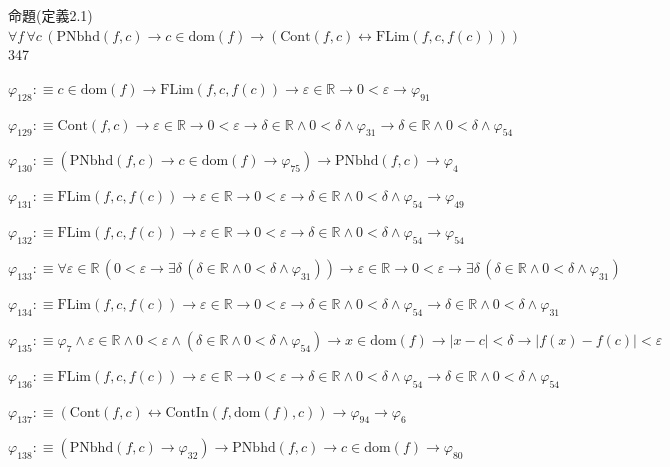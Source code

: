 \begin{fullproof}{命題(定義2.1)}{$\forall f\,\forall c\,(\mathrm{PNbhd}(f,c) \to c \in \mathrm{dom}(f) \to (\mathrm{Cont}(f,c) \leftrightarrow \mathrm{FLim}(f,c,f(c))))$}{347}
\begin{abbrevlist}
\item $\varphi_{128} :\equiv c \in \mathrm{dom}(f) \to \mathrm{FLim}(f,c,f(c)) \to \varepsilon \in \mathbb{R} \to 0 < \varepsilon \to \varphi_{91}$
\item $\varphi_{129} :\equiv \mathrm{Cont}(f,c) \to \varepsilon \in \mathbb{R} \to 0 < \varepsilon \to \delta \in \mathbb{R} \land 0 < \delta \land \varphi_{31} \to \delta \in \mathbb{R} \land 0 < \delta \land \varphi_{54}$
\item $\varphi_{130} :\equiv (\mathrm{PNbhd}(f,c) \to c \in \mathrm{dom}(f) \to \varphi_{75}) \to \mathrm{PNbhd}(f,c) \to \varphi_{4}$
\item $\varphi_{131} :\equiv \mathrm{FLim}(f,c,f(c)) \to \varepsilon \in \mathbb{R} \to 0 < \varepsilon \to \delta \in \mathbb{R} \land 0 < \delta \land \varphi_{54} \to \varphi_{49}$
\item $\varphi_{132} :\equiv \mathrm{FLim}(f,c,f(c)) \to \varepsilon \in \mathbb{R} \to 0 < \varepsilon \to \delta \in \mathbb{R} \land 0 < \delta \land \varphi_{54} \to \varphi_{54}$
\item $\varphi_{133} :\equiv \forall \varepsilon \in \mathbb{R}\,(0 < \varepsilon \to \exists \delta\,(\delta \in \mathbb{R} \land 0 < \delta \land \varphi_{31})) \to \varepsilon \in \mathbb{R} \to 0 < \varepsilon \to \exists \delta\,(\delta \in \mathbb{R} \land 0 < \delta \land \varphi_{31})$
\item $\varphi_{134} :\equiv \mathrm{FLim}(f,c,f(c)) \to \varepsilon \in \mathbb{R} \to 0 < \varepsilon \to \delta \in \mathbb{R} \land 0 < \delta \land \varphi_{54} \to \delta \in \mathbb{R} \land 0 < \delta \land \varphi_{31}$
\item $\varphi_{135} :\equiv \varphi_{7} \land \varepsilon \in \mathbb{R} \land 0 < \varepsilon \land (\delta \in \mathbb{R} \land 0 < \delta \land \varphi_{54}) \to x \in \mathrm{dom}(f) \to \lvert x - c \rvert < \delta \to \lvert f(x) - f(c) \rvert < \varepsilon$
\item $\varphi_{136} :\equiv \mathrm{FLim}(f,c,f(c)) \to \varepsilon \in \mathbb{R} \to 0 < \varepsilon \to \delta \in \mathbb{R} \land 0 < \delta \land \varphi_{54} \to \delta \in \mathbb{R} \land 0 < \delta \land \varphi_{54}$
\item $\varphi_{137} :\equiv (\mathrm{Cont}(f,c) \leftrightarrow \mathrm{ContIn}(f,\mathrm{dom}(f),c)) \to \varphi_{94} \to \varphi_{6}$
\item $\varphi_{138} :\equiv (\mathrm{PNbhd}(f,c) \to \varphi_{32}) \to \mathrm{PNbhd}(f,c) \to c \in \mathrm{dom}(f) \to \varphi_{80}$

\end{abbrevlist}
\end{fullproof}
